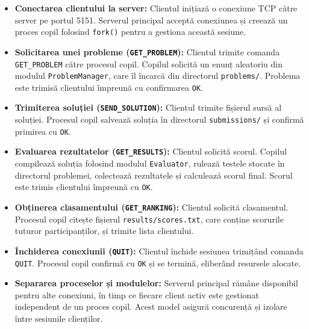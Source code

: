 \documentclass[runningheads]{llncs}
\begin{document}
\begin{itemize}[noitemsep, topsep=0pt]
    \item \textbf{Conectarea clientului la server:} Clientul inițiază o conexiune TCP către server pe portul 5151. Serverul principal acceptă conexiunea și creează un proces copil folosind \texttt{fork()} pentru a gestiona această sesiune.

    \vspace{5mm}
    
    \item \textbf{Solicitarea unei probleme (\texttt{GET\_PROBLEM}):} Clientul trimite comanda \texttt{GET\_PROBLEM} către procesul copil. Copilul solicită un enunț aleatoriu din modulul \texttt{ProblemManager}, care îl încarcă din directorul \texttt{problems/}. Problema este trimisă clientului împreună cu confirmarea \texttt{OK}.

    \vspace{5mm}
    
    \item \textbf{Trimiterea soluției (\texttt{SEND\_SOLUTION}):} Clientul trimite fișierul sursă al soluției. Procesul copil salvează soluția în directorul \texttt{submissions/} și confirmă primirea cu \texttt{OK}.

    \vspace{5mm}
    
    \item \textbf{Evaluarea rezultatelor (\texttt{GET\_RESULTS}):} Clientul solicită scorul. Copilul compilează soluția folosind modulul \texttt{Evaluator}, rulează testele stocate în directorul problemei, colectează rezultatele și calculează scorul final. Scorul este trimis clientului împreună cu \texttt{OK}.

    \vspace{5mm}
    
    \item \textbf{Obținerea clasamentului (\texttt{GET\_RANKING}):} Clientul solicită clasamentul. Procesul copil citește fișierul \texttt{results/scores.txt}, care conține scorurile tuturor participanților, și trimite lista clientului.

    \vspace{5mm}
    
    \item \textbf{Închiderea conexiunii (\texttt{QUIT}):} Clientul închide sesiunea trimițând comanda \texttt{QUIT}. Procesul copil confirmă cu \texttt{OK} și se termină, eliberând resursele alocate.

    \vspace{5mm}
    
    \item \textbf{Separarea proceselor și modulelor:} Serverul principal rămâne disponibil pentru alte conexiuni, în timp ce fiecare client activ este gestionat independent de un proces copil. Acest model asigură concurență și izolare între sesiunile clienților.
\end{itemize}
\end{document}
